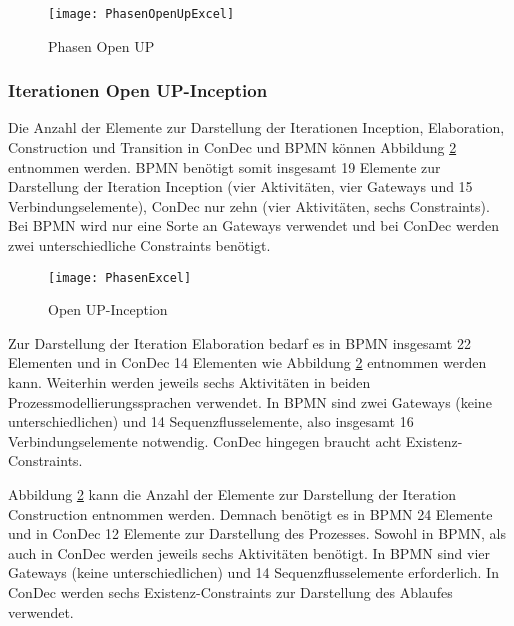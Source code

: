 \begin{figure}[htp]
\begin{center}
  \texttt{[image: PhasenOpenUpExcel]} %
  \caption{Phasen Open UP}
  \label{fig:PhasenOpenUpExcel}
\end{center}
\end{figure}



\subsubsection {Iterationen Open UP-Inception}

Die Anzahl der Elemente zur Darstellung der Iterationen Inception, Elaboration, Construction und Transition in ConDec und BPMN können Abbildung \ref{fig:PhasenExcel} entnommen werden. BPMN benötigt somit insgesamt 19 Elemente zur Darstellung der Iteration Inception (vier Aktivitäten, vier Gateways und 15 Verbindungselemente), ConDec nur zehn (vier Aktivitäten, sechs Constraints). Bei BPMN wird nur eine Sorte an Gateways verwendet und bei ConDec werden zwei unterschiedliche Constraints benötigt.\newline
\begin{figure}[htp]
\begin{center}
  \texttt{[image: PhasenExcel]} %
  \caption{Open UP-Inception}
  \label{fig:PhasenExcel}
\end{center}
\end{figure}

Zur Darstellung der Iteration Elaboration bedarf es in BPMN insgesamt 22 Elementen und in ConDec 14 Elementen wie Abbildung \ref{fig:PhasenExcel} entnommen werden kann. Weiterhin werden jeweils sechs Aktivitäten in beiden Prozessmodellierungssprachen verwendet. In BPMN sind zwei Gateways (keine unterschiedlichen) und 14 Sequenzflusselemente, also insgesamt 16 Verbindungselemente notwendig. ConDec hingegen braucht acht Existenz-Constraints. \newline

Abbildung \ref{fig:PhasenExcel} kann die Anzahl der Elemente zur Darstellung der Iteration Construction entnommen werden. Demnach benötigt es in BPMN 24 Elemente und in ConDec 12 Elemente zur Darstellung des Prozesses. Sowohl in BPMN, als auch in ConDec werden jeweils sechs Aktivitäten benötigt. In BPMN sind vier Gateways (keine unterschiedlichen) und 14 Sequenzflusselemente erforderlich. In ConDec werden sechs Existenz-Constraints zur Darstellung des Ablaufes verwendet.\newline


